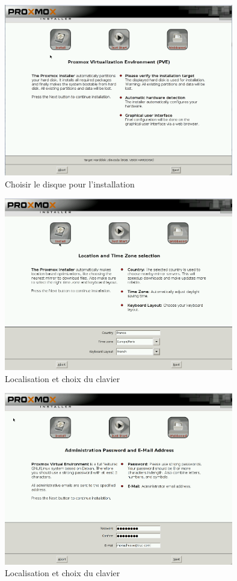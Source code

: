 \documentclass[12pt,a4paper]{article}
\begin{document}
\begin{figure}[!ht]
\center
\includegraphics[width=10cm]{Images/3.PNG}  
\caption{Choisir le disque pour l'installation}
\end{figure}


\begin{figure}[!ht]
\center
\includegraphics[width=10cm]{Images/4.PNG}  
\caption{Localisation et choix du clavier}
\end{figure}

\begin{figure}[!ht]
\center
\includegraphics[width=10cm]{Images/5.PNG}  
\caption{Localisation et choix du clavier}
\end{figure}
\end{document}
